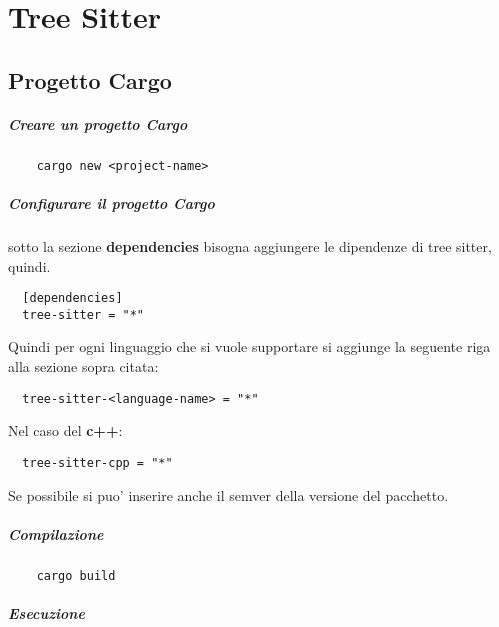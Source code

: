 \chapter{Tree Sitter}

\section{Progetto Cargo}

\paragraph{Creare un progetto Cargo}

\begin{verbatim}
	cargo new <project-name>
\end{verbatim}

\paragraph{Configurare il progetto Cargo}

sotto la sezione \textbf{dependencies} bisogna aggiungere le dipendenze di tree sitter, quindi.

\begin{verbatim}
  [dependencies]
  tree-sitter = "*"
\end{verbatim}

Quindi per ogni linguaggio che si vuole supportare si aggiunge la seguente riga alla sezione sopra citata:

\begin{verbatim}
  tree-sitter-<language-name> = "*"
\end{verbatim}

Nel caso del \textbf{c++}:

\begin{verbatim}
  tree-sitter-cpp = "*"
\end{verbatim}

Se possibile si puo' inserire anche il semver della versione del pacchetto.

\paragraph{Compilazione}

\begin{verbatim}
	cargo build
\end{verbatim}

\paragraph{Esecuzione}

